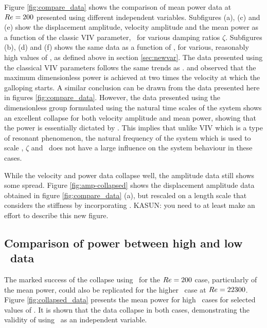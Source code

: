  
 Figure \ref{fig:compare_data} shows the comparison of mean power data at $Re=200$ presented using different independent variables. Subfigures (a), (c) and (e) show the displacement amplitude, velocity amplitude and the mean power as a function of the classic VIV parameter, \ustar \ for various damping ratios $\zeta$. Subfigures (b), (d) and (f) shows the same data as a function of \massdamp, for various, reasonably high values of \massstiff, as defined above in section \ref{sec:newvar}. The data presented using the classical VIV parameters follows the same trends as \cite{Barrero-Gil2010a}. \citet{Barrero-Gil2010a} and \citet{vicente-Ludlam2014} observed that the maximum dimensionless power is achieved at two times the velocity at which the galloping starts. A similar conclusion can be drawn from the data presented here in figures \ref{fig:compare_data}. However, the data presented using the dimensionless group formulated using the natural time scales of the system shows an excellent collapse for both velocity amplitude and mean power, showing that the power is essentially dictated by \massdamp. This implies that unlike VIV which is a type of resonant phenomenon, the natural frequency of the system which is used to scale \ustar, $\zeta$ and \massstiff\ does not have a large influence on the system behaviour in these cases.
 
 
 
 
  
 
While the velocity and power data collapse well, the amplitude data still shows some spread. Figure \ref{fig:amp-collapsed} shows the displacement amplitude data obtained in figure \ref{fig:compare_data} (a), but rescaled on a length scale that considers the stiffness by incorporating \massstiff. KASUN: you need to at least make an effort to describe this new figure.

 \subsection{Comparison of power between high and low \reynoldsnumber\ data}   

\label{sec:low_vs_high_re}
The marked success of the collapse using \massdamp\ for the $Re = 200$ case, particularly of the mean power, could also be replicated for the higher \reynoldsnumber\ case at $Re = 22300$. Figure \ref{fig:collapsed_data} presents the mean power for high \reynoldsnumber\ cases for selected values of \massstiff. It is shown that the data collapse in both cases, demonstrating the validity of using \massdamp\ as an independent variable.

